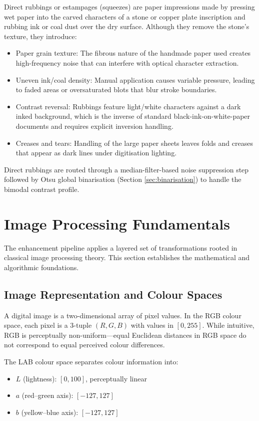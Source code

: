 Direct rubbings or estampages (squeezes) are paper impressions made by pressing wet paper into the carved characters of a stone or copper plate inscription and rubbing ink or coal dust over the dry surface. Although they remove the stone's texture, they introduce:

\begin{itemize}
	\item Paper grain texture: The fibrous nature of the handmade paper used creates high-frequency noise that can interfere with optical character extraction.
	\item Uneven ink/coal density: Manual application causes variable pressure, leading to faded areas or oversaturated blots that blur stroke boundaries.
	\item Contrast reversal: Rubbings feature light/white characters against a dark inked background, which is the inverse of standard black-ink-on-white-paper documents and requires explicit inversion handling.
	\item Creases and tears: Handling of the large paper sheets leaves folds and creases that appear as dark lines under digitisation lighting.
\end{itemize}

Direct rubbings are routed through a median-filter-based noise suppression step followed by Otsu global binarisation (Section \ref{sec:binarisation}) to handle the bimodal contrast profile.

\section{Image Processing Fundamentals}\label{sec:fundamentals}

The enhancement pipeline applies a layered set of transformations rooted in classical image processing theory. This section establishes the mathematical and algorithmic foundations.

\subsection{Image Representation and Colour Spaces}

A digital image is a two-dimensional array of pixel values. In the RGB colour space, each pixel is a 3-tuple $(R, G, B)$ with values in $[0, 255]$. While intuitive, RGB is perceptually non-uniform—equal Euclidean distances in RGB space do not correspond to equal perceived colour differences.

The LAB colour space separates colour information into:
\begin{itemize}
	\item $L$ (lightness): $[0, 100]$, perceptually linear
	\item $a$ (red–green axis): $[-127, 127]$
	\item $b$ (yellow–blue axis): $[-127, 127]$
\end{itemize}

